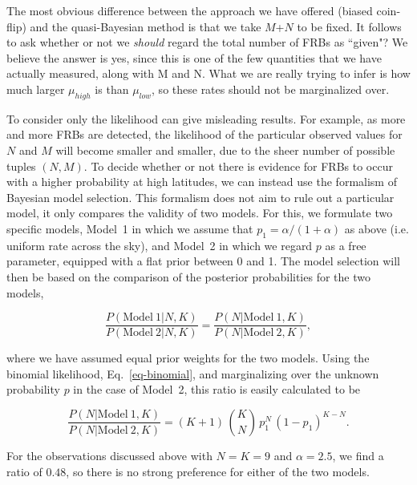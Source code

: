 \documentclass[useAMS,usenatbib]{mn2e}
\begin{document}
The most obvious difference between the approach we have offered (biased coin-flip) 
and the quasi-Bayesian method is that we take $M$+$N$ to be fixed. It follows to ask 
whether or not we \textit{should} regard the total number of FRBs as ``given"? 
We believe the answer is yes, since this is one of the few quantities that we 
have actually measured, along with M and N. What we are really trying 
to infer is how much larger $\mu_{high}$ is than $\mu_{low}$, so these 
rates should not be marginalized over. 

To consider only the likelihood can give misleading results. 
For example, as more and more FRBs are detected, the 
likelihood of the particular observed values for $N$ and $M$ 
will become smaller and smaller, due to the sheer number of 
possible tuples $(N,M)$.
To decide whether or not there is evidence for FRBs to occur with a 
higher probability at high latitudes, we can instead use the formalism 
of Bayesian model selection. This formalism does not aim to rule out a
particular model, it only compares the validity of two models. 
For this, we formulate two specific models, Model~1 in which we
assume that $p_1=\alpha/(1+\alpha)$ as above (i.e. uniform rate across the sky), and Model~2 in 
which we regard $p$ as a free parameter, equipped with a flat prior 
between 0 and 1. The model selection will then be based on the comparison
of the posterior probabilities for the two models,
   
   
\begin{equation}
	\frac{P(\mathrm{Model}~1|N,K)}{P(\mathrm{Model}~2|N,K)} = \frac{P(N|\mathrm{Model}~1,K)}{P(N|\mathrm{Model}~2,K)},
\end{equation}

\noindent where we have assumed equal prior weights for the two models. 
Using the binomial likelihood, Eq.~\eqref{eq-binomial}, and
marginalizing over the unknown probability $p$ in the case of Model~2, 
this ratio is easily calculated to be

\begin{equation}
\frac{P(N|\mathrm{Model}~1,K)}{P(N|\mathrm{Model}~2,K)} = (K + 1) \, \binom{K}{N} \, p_1^N \, \left(1 - p_1\right)^{K-N}.
\end{equation}

\noindent For the observations discussed above with $N = K = 9$ 
and $\alpha = 2.5$, we find a ratio of $0.48$, so there is
no strong preference for either of the two models.
\end{document}
